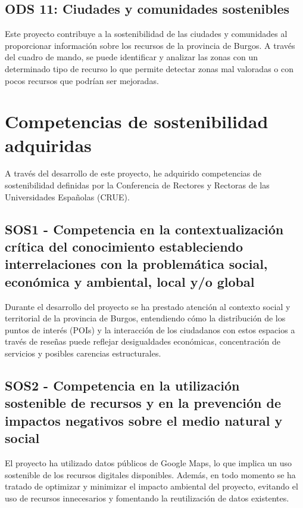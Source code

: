 \subsection{ODS 11: Ciudades y comunidades sostenibles}

Este proyecto contribuye a la sostenibilidad de las ciudades y comunidades al proporcionar información sobre los recursos de la provincia de Burgos.
A través del cuadro de mando, se puede identificar y analizar las zonas con un determinado tipo de recurso lo que permite detectar zonas mal valoradas o con pocos recursos que podrían ser mejoradas.

\section{Competencias de sostenibilidad adquiridas}

A través del desarrollo de este proyecto, he adquirido competencias de sostenibilidad definidas por la Conferencia de Rectores y Rectoras de las Universidades Españolas (CRUE)\cite{crue}.

\subsection{SOS1 - Competencia en la contextualización crítica del conocimiento estableciendo interrelaciones
con la problemática social, económica y ambiental, local y/o global}

Durante el desarrollo del proyecto se ha prestado atención al contexto social y territorial de la provincia de Burgos, 
entendiendo cómo la distribución de los puntos de interés (POIs) y la interacción de los ciudadanos con estos espacios a través de reseñas puede reflejar desigualdades económicas, concentración de servicios y posibles carencias estructurales. 

\subsection{SOS2 - Competencia en la utilización sostenible de recursos y en la prevención de impactos negativos sobre el medio natural y social}

El proyecto ha utilizado datos públicos de Google Maps, lo que implica un uso sostenible de los recursos digitales disponibles.
Además, en todo momento se ha tratado de optimizar y minimizar el impacto ambiental del proyecto, evitando el uso de recursos innecesarios y fomentando la reutilización de datos existentes.

